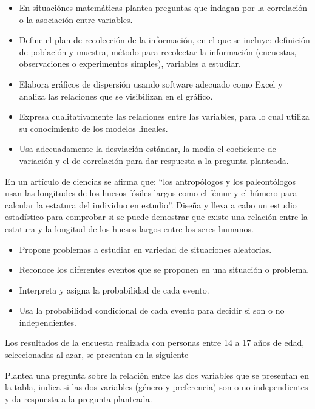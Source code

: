 \begin{itemize}
  \item En situaciónes matemáticas plantea preguntas que indagan por la correlación o la asociación entre variables.
  \item Define el plan de recolección de la información, en el que se incluye: definición de población y muestra, método para recolectar la información (encuestas, observaciones o experimentos simples), variables a estudiar.
  \item Elabora gráficos de dispersión usando software adecuado como Excel y analiza las relaciones que se visibilizan en el gráfico.
  \item Expresa cualitativamente las relaciones entre las variables, para lo cual utiliza su conocimiento de los modelos lineales.
  \item Usa adecuadamente la desviación estándar, la media el coeficiente de variación y el de correlación para dar respuesta a la pregunta planteada.
\end{itemize}

\ejemplo

En un artículo de ciencias se afirma que: “los antropólogos y los paleontólogos usan las longitudes de los huesos fósiles largos como el fémur y el húmero para calcular la estatura del individuo en estudio”. Diseña y lleva a cabo un estudio estadístico para comprobar si se puede demostrar que existe una relación entre la estatura y la longitud de los huesos largos entre los seres humanos.


\evidencias

\begin{itemize}
  \item Propone problemas a estudiar en variedad de situaciones aleatorias.
  \item Reconoce los diferentes eventos que se proponen en una situación o problema.
  \item Interpreta y asigna la probabilidad de cada evento.
  \item Usa la probabilidad condicional de cada evento para decidir si son o no independientes.
\end{itemize}

\ejemplo

Los resultados de la encuesta realizada con personas entre 14 a 17 años de edad, seleccionadas al azar, se presentan en la siguiente


Plantea una pregunta sobre la relación entre las dos variables que se presentan en la tabla, indica si las dos variables (género y preferencia) son o no independientes y da respuesta a la pregunta planteada.

